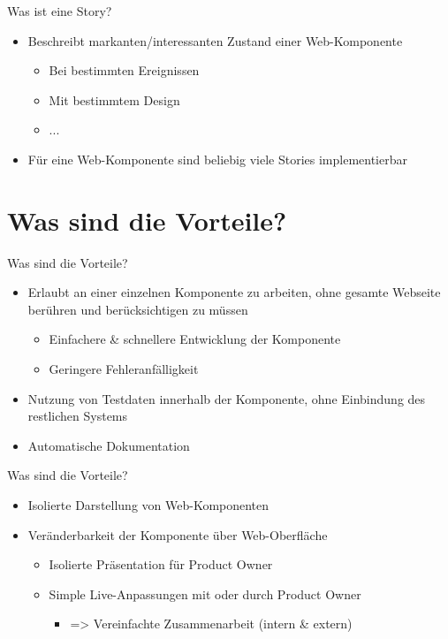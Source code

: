 \documentclass{beamer}
\begin{document}
\begin{frame}{Was ist eine Story?}
	\begin{itemize}
		\item Beschreibt markanten/interessanten Zustand einer Web-Komponente
			\begin{itemize}
				\item Bei bestimmten Ereignissen
				\item Mit bestimmtem Design
				\item ...
			\end{itemize}
		\item Für eine Web-Komponente sind beliebig viele Stories implementierbar
	\end{itemize}
\end{frame}


\section{Was sind die Vorteile?} %

\begin{frame}{Was sind die Vorteile?}
	\begin{itemize}
		\item Erlaubt an einer einzelnen Komponente zu arbeiten, ohne gesamte Webseite berühren und berücksichtigen zu müssen
		\begin{itemize}
			\item Einfachere \& schnellere Entwicklung der Komponente
			\item Geringere Fehleranfälligkeit
		\end{itemize}
		\item Nutzung von Testdaten innerhalb der Komponente, ohne Einbindung des restlichen Systems
		\item Automatische Dokumentation
	\end{itemize}
\end{frame}

\begin{frame}{Was sind die Vorteile?}
	\begin{itemize}
		\item Isolierte Darstellung von Web-Komponenten
		\item Veränderbarkeit der Komponente über Web-Oberfläche
		\begin{itemize}
			\item Isolierte Präsentation für Product Owner
			\item Simple Live-Anpassungen mit oder durch Product Owner
			\begin{itemize}
				\item => Vereinfachte Zusammenarbeit (intern \& extern)
			\end{itemize}
		\end{itemize}
	\end{itemize}
\end{frame}
\end{document}
